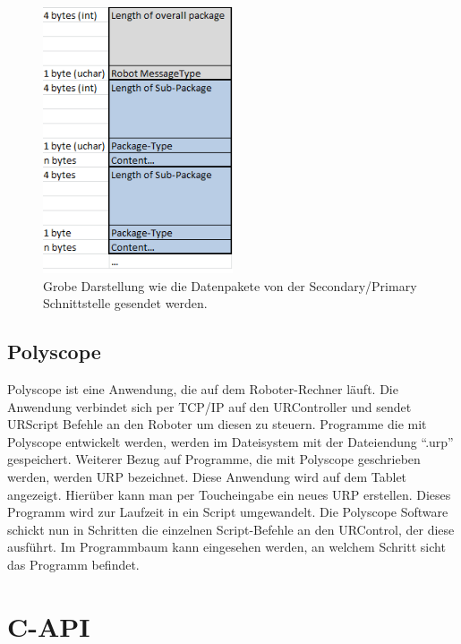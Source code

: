 \begin{figure}[H]
  \centering
    \includegraphics[width=0.5\textwidth]{pic/secondary_datapackage_scheme.png}
      \caption[Schema des Datenpakets gesendet von der Secondary Schnittstelle]{Grobe Darstellung wie die Datenpakete von der Secondary/Primary Schnittstelle gesendet werden.}
      \label{fig:datascheme_of_secondary_interface}
\end{figure}

\subsection{Polyscope}
\label{urcontrol_polyscope_gru}

Polyscope ist eine Anwendung, die auf dem Roboter-Rechner läuft. Die Anwendung verbindet sich per \acs{TCP/IP} auf den URController und sendet URScript Befehle an den Roboter um diesen zu steuern.
Programme die mit Polyscope entwickelt werden, werden im Dateisystem mit der Dateiendung ``.urp'' gespeichert. Weiterer Bezug auf Programme, die mit Polyscope geschrieben werden, werden \ac{URP} bezeichnet.
Diese Anwendung wird auf dem Tablet angezeigt. Hierüber kann man per Toucheingabe ein neues \acs{URP} erstellen. Dieses Programm wird zur Laufzeit in ein Script umgewandelt. Die Polyscope Software schickt nun in Schritten die einzelnen Script-Befehle an den URControl, der diese ausführt. Im Programmbaum kann eingesehen werden, an welchem Schritt sicht das Programm befindet.

\section{C-API}
\label{sec:rest_prinzip_gru}

